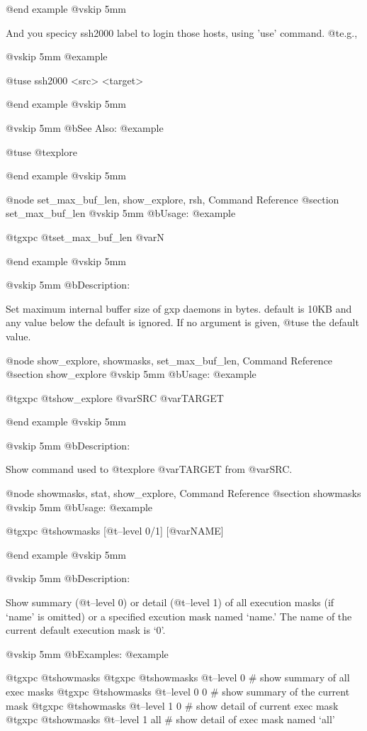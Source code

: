 @end example
@vskip 5mm

  And you specicy ssh2000 label to login those hosts, using 'use' command. @t{e}.g.,

@vskip 5mm
@example

     @t{use} ssh2000 <src> <target>

@end example
@vskip 5mm

@vskip 5mm
@b{See Also:}
@example

  @t{use} @t{explore}

@end example
@vskip 5mm


@node set_max_buf_len, show_explore, rsh, Command Reference
@section set_max_buf_len
@vskip 5mm
@b{Usage:}
@example

  @t{gxpc} @t{set_max_buf_len} @var{N}

@end example
@vskip 5mm

@vskip 5mm
@b{Description:}


  Set maximum internal buffer size of gxp daemons in bytes.
  default is 10KB and any value below the default is ignored. If no argument
  is given, @t{use} the default value.

@node show_explore, showmasks, set_max_buf_len, Command Reference
@section show_explore
@vskip 5mm
@b{Usage:}
@example

  @t{gxpc} @t{show_explore} @var{SRC} @var{TARGET}

@end example
@vskip 5mm

@vskip 5mm
@b{Description:}


  Show command used to @t{explore} @var{TARGET} from @var{SRC}.

@node showmasks, stat, show_explore, Command Reference
@section showmasks
@vskip 5mm
@b{Usage:}
@example

  @t{gxpc} @t{showmasks} [@t{--level} 0/1] [@var{NAME}]

@end example
@vskip 5mm

@vskip 5mm
@b{Description:}


  Show summary (@t{--level} 0) or detail (@t{--level} 1) of all execution
masks (if `name' is omitted) or a specified excution mask named
`name.' The name of the current default execution mask is `0'.

@vskip 5mm
@b{Examples:}
@example

  @t{gxpc} @t{showmasks}
  @t{gxpc} @t{showmasks} @t{--level} 0     # show summary of all exec masks
  @t{gxpc} @t{showmasks} @t{--level} 0 0   # show summary of the current mask
  @t{gxpc} @t{showmasks} @t{--level} 1 0   # show detail of current exec mask
  @t{gxpc} @t{showmasks} @t{--level} 1 all # show detail of exec mask named `all'


